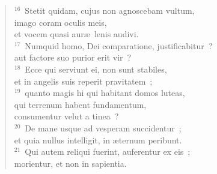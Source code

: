 \begin{flushleft}
\begin{verse}
${}^{16}$~Stetit quidam, cujus non agnoscebam vultum,\\ imago coram oculis meis,\\ et vocem quasi aur\ae\ lenis audivi.\\
${}^{17}$~Numquid homo, Dei comparatione, justificabitur~?\\ aut factore suo purior erit vir~?\\
${}^{18}$~Ecce qui serviunt ei, non sunt stabiles,\\ et in angelis suis reperit pravitatem~;\\
${}^{19}$~quanto magis hi qui habitant domos luteas,\\ qui terrenum habent fundamentum,\\ consumentur velut a tinea~?\\
${}^{20}$~De mane usque ad vesperam succidentur~;\\ et quia nullus intelligit, in \ae ternum peribunt.\\
${}^{21}$~Qui autem reliqui fuerint, auferentur ex eis~;\\ morientur, et non in sapientia.\end{verse}\end{flushleft}


